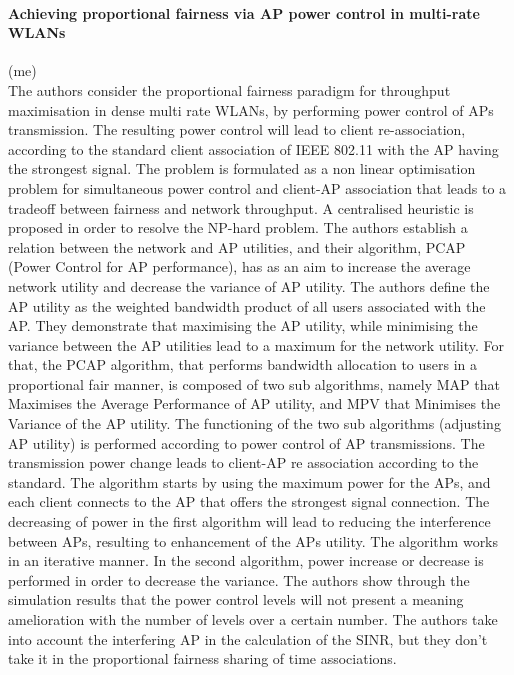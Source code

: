 \documentclass[journal,transmag]{IEEEtran}
\begin{document}
\paragraph{Achieving proportional fairness via AP power control in multi-rate WLANs} (me) 
\cite{11proportional_fairness_power_control}\\

The authors consider the proportional fairness paradigm for throughput maximisation in dense multi rate WLANs, by performing power control of APs transmission. The resulting power control will lead to client re-association, according to the standard client association of IEEE 802.11 with the AP having the strongest signal. The problem is formulated as a non linear optimisation problem for simultaneous power control and client-AP association that leads to a tradeoff between fairness and network throughput. A centralised heuristic is proposed in order to resolve the NP-hard problem. The authors establish a relation between the network and AP utilities, and their algorithm, PCAP (Power Control for AP performance), has as an aim to increase the average network utility and decrease the variance of AP utility. The authors define the AP utility as the weighted bandwidth product of all users associated with the AP. They demonstrate that maximising the AP utility, while minimising the variance between the AP utilities lead to a maximum for the network utility. For that, the PCAP algorithm, that performs bandwidth allocation to users in a proportional fair manner, is composed of two sub algorithms, namely MAP that Maximises the Average Performance of AP utility, and MPV that Minimises the Variance of the AP utility. The functioning of the two sub algorithms (adjusting AP utility) is performed according to power control of AP transmissions. The transmission power change leads to client-AP re association according to the standard. The algorithm starts by using the maximum power for the APs, and each client connects to the AP that offers the strongest signal connection. The decreasing of power in the first algorithm will lead to reducing the interference between APs, resulting to enhancement of the APs utility. The algorithm works in an iterative manner. In the second algorithm, power increase or decrease is performed in order to decrease the variance. The authors show through the simulation results that the power control levels will not present a meaning amelioration with the number of levels over a certain number. The authors take into account the interfering AP in the calculation of the SINR, but they don't take it in the proportional fairness sharing of time associations.\\
\end{document}
